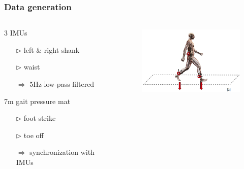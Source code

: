 \documentclass[aspectratio=43]{beamer} 	%
\begin{document}
\begin{frame}
\frametitle {Data generation}

\begin{columns}
\begin{column}{5.3cm}
\begin{block}
{ 3 IMUs }
\begin{itemize}
\item [$\triangleright$]left \& right shank
\item [$\triangleright$] waist
\item [$\Rightarrow$] 5Hz low-pass filtered
\end{itemize}
\end{block}
\begin{block}
{7m gait pressure mat}
\begin{itemize}
\item [$\triangleright$] foot strike
\item [$\triangleright$] toe off
\item [$\Rightarrow$] synchronization with IMUs
\end{itemize}
\end{block}

\end{column}

\begin{column}{5cm}
\begin{figure}[!t]
\centering
\includegraphics[height=3.4cm]{datageneration.png}
\end{figure}
\begin{block}
{}
\end{block}

\end{column}


\end{columns}
\end{frame}
\end{document}
